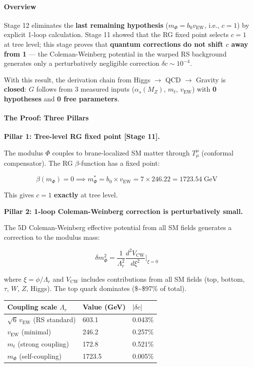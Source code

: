 \documentclass[
  11pt,
]{article}
\begin{document}
\hypertarget{overview-11}{%
\paragraph{Overview}\label{overview-11}}

Stage 12 eliminates the \textbf{last remaining hypothesis}
(\(m_\Phi = b_0 v_\text{EW}\), i.e., \(c = 1\)) by explicit 1-loop
calculation. Stage 11 showed that the RG fixed point selects \(c = 1\)
at tree level; this stage proves that \textbf{quantum corrections do not
shift \(c\) away from 1} --- the Coleman-Weinberg potential in the
warped RS background generates only a perturbatively negligible
correction \(\delta c \sim 10^{-4}\).

With this result, the derivation chain from Higgs \(\to\) QCD \(\to\)
Gravity is \textbf{closed}: \(G\) follows from 3 measured inputs
(\(\alpha_s(M_Z)\), \(m_t\), \(v_\text{EW}\)) with \textbf{0 hypotheses}
and \textbf{0 free parameters}.

\bigskip

\hypertarget{the-proof-three-pillars}{%
\paragraph{The Proof: Three Pillars}\label{the-proof-three-pillars}}

\textbf{Pillar 1: Tree-level RG fixed point {[}Stage 11{]}.}

The modulus \(\Phi\) couples to brane-localized SM matter through
\(T^\mu_\mu\) (conformal compensator). The RG \(\beta\)-function has a
fixed point:

\[\beta(m_\Phi) = 0 \implies m_\Phi^* = b_0 \times v_\text{EW} = 7 \times 246.22 = 1723.54\;\text{GeV} \tag{157}\]

This gives \(c = 1\) \textbf{exactly} at tree level.

\textbf{Pillar 2: 1-loop Coleman-Weinberg correction is perturbatively
small.}

The 5D Coleman-Weinberg effective potential from all SM fields generates
a correction to the modulus mass:

\[\delta m_\Phi^2 = \frac{1}{\Lambda_r^2} \frac{d^2 V_\text{CW}}{d\xi^2}\bigg|_{\xi=0} \tag{158}\]

where \(\xi = \phi/\Lambda_r\) and \(V_\text{CW}\) includes
contributions from all SM fields (top, bottom, \(\tau\), \(W\), \(Z\),
Higgs). The top quark dominates (\$\sim\$97\% of total).

\begin{longtable}[]{@{}lll@{}}
\toprule
Coupling scale \(\Lambda_r\) & Value (GeV) &
\(|\delta c|\)\tabularnewline
\midrule
\endhead
\(\sqrt{6}\,v_\text{EW}\) (RS standard) & 603.1 & 0.043\%\tabularnewline
\(v_\text{EW}\) (minimal) & 246.2 & 0.257\%\tabularnewline
\(m_t\) (strong coupling) & 172.8 & 0.521\%\tabularnewline
\(m_\Phi\) (self-coupling) & 1723.5 & 0.005\%\tabularnewline
\bottomrule
\end{longtable}
\end{document}
